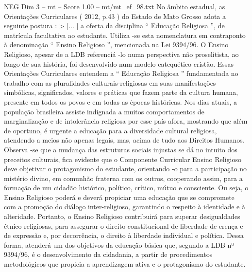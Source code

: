 \begin{textsample}{NEG Dim 3 – mt – Score 1.00 – mt/mt\_ef\_98.txt}
No âmbito estadual, as Orientações Curriculares ( 2012, p.43 ) do Estado de Mato Grosso adota a seguinte postura : > [... ] a oferta da disciplina “ Educação Religiosa ”, de matrícula facultativa ao estudante.
Utiliza -se esta nomenclatura em contraponto à denominação “ Ensino Religioso ”, mencionada na Lei 9394/96.
O Ensino Religioso, apesar de a LDB referenciá -lo numa perspectiva não proselitista, ao longo de sua história, foi desenvolvido num modelo catequético cristão.
Essas Orientações Curriculares entendem a “ Educação Religiosa ” fundamentada no trabalho com as pluralidades culturais-religiosas em suas manifestações simbólicas, significados, valores e práticas que fazem parte da cultura humana, presente em todos os povos e em todas as épocas históricas.
Nos dias atuais, a população brasileira assiste indignada a muitos comportamentos de marginalização e de intolerância religiosa por esse país afora, mostrando que além de oportuno, é urgente a educação para a diversidade cultural religiosa, atendendo a meios não apenas legais, mas, acima de tudo aos Direitos Humanos.
Observa -se que a mudança das estruturas sociais injustas se dá no intuito dos preceitos culturais, fica evidente que o Componente Curricular Ensino Religioso deve objetivar o protagonismo do estudante, orientando -o para a participação no mistério divino, em comunhão fraterna com os outros, cooperando assim, para a formação de um cidadão histórico, político, crítico, mútuo e consciente.
Ou seja, o Ensino Religioso poderá e deverá propiciar uma educação que se compromete com a promoção do diálogo inter-religioso, garantindo o respeito à identidade e à alteridade.
Portanto, o Ensino Religioso contribuirá para superar desigualdades étnico-religiosas, para assegurar o direito constitucional de liberdade de crença e de expressão e, por decorrência, o direito à liberdade individual e política.
Dessa forma, atenderá um dos objetivos da educação básica que, segundo a LDB nº 9394/96, é o desenvolvimento da cidadania, a partir de procedimentos metodológicos que propicia a aprendizagem ativa e o protagonismo do estudante.

\end{textsample}
